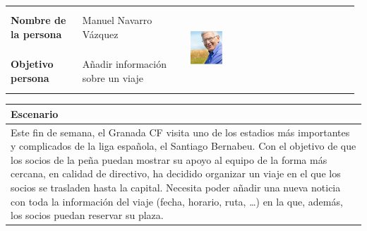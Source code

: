 \documentclass[11pt]{article}
\begin{document}
\begin{table}[H]
  \centering
  \begin{tabular}{p{0.2\linewidth}|p{0.3\linewidth}p{0.475\linewidth}}
    \toprule
    \textbf{Nombre de la persona} & Manuel Navarro Vázquez &\multirow{2}{*}{\begin{minipage}{1.\textwidth}\includegraphics[width=0.2\textwidth, height=30mm]{Pedro}\end{minipage}}\\
    \textbf{Objetivo persona} & Añadir información sobre un viaje & \\
    \bottomrule
  \end{tabular}

\begin{tabular}{p{1.028\linewidth}}
  \textbf{Escenario}\\
  \midrule
  Este fin de semana, el Granada CF visita uno de los estadios más importantes y complicados de la liga española, el Santiago Bernabeu. Con el objetivo de que los socios de la peña puedan mostrar su apoyo al equipo de la forma más cercana, en calidad de directivo, ha decidido organizar un viaje en el que los socios se trasladen hasta la capital. Necesita poder añadir una nueva noticia con toda la información del viaje (fecha, horario, ruta, \dots) en la que, además, los socios puedan reservar su plaza.
\end{tabular}
\end{table}
\end{document}
